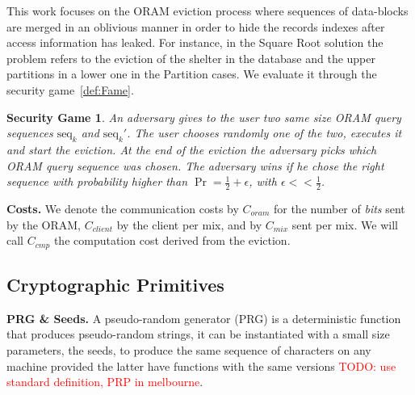 \documentclass{llncs}
\newtheorem{privdef}{Privacy Definition}
\newtheorem*{secgme}{Security Game}
\newcommand{\todo}[1]{\textcolor{red}{TODO: #1}}
\begin{document}
This work focuses on the ORAM eviction process where sequences of data-blocks are merged in an oblivious manner in order to hide the records indexes after access information has leaked. For instance, in the Square Root solution the problem refers to the eviction of the shelter in the database and the upper partitions in a lower one in the Partition cases. We  evaluate it through the security game~\ref{def:Fame}.
%
\iffalse
\begin{privdef}
An ORAM eviction process is considered oblivious if an adversary cannot distinguish after eviction whether a specific record has been accessed.\\
That is to say, for the eviction of $s$ elements in an array of $n$ elements, and with $\epsilon =\mathcal{O}\left ( \frac{1}{n} \right )$, we have, $$ \forall i \in \llbracket 1, n \rrbracket,\ |\Pr(index_i \text{ was not retrieved} ) - \Pr(index_i \text{ was retrieved} )| \leq \epsilon$$
\label{def:Oblivious}
\end{privdef}
\fi
%
\begin{secgme}
An adversary gives to the user two same size ORAM query sequences $\text{seq}_k$ and $\text{seq}_k'$. The user chooses randomly one of the two, executes it and start the eviction. At the end of the eviction the adversary picks which ORAM query sequence was chosen. The adversary wins if he chose the right sequence with probability higher than $\Pr = \frac{1}{2}+\epsilon$, with $\epsilon<<\frac{1}{2}$.
\label{def:Game}
\end{secgme} 
%
\iffalse
\begin{privdef}{Eviction Old Security.}
An ORAM eviction process is considered secure if an adversary cannot distinguish after eviction the location of any specific record. 
\end{privdef}
\fi
%
\noindent\textbf{Costs.} We denote the communication costs by $C_{oram}$ for the number of \emph{bits} sent by the ORAM, $C_{client}$ by the client per mix, and by $C_{mix}$ sent per mix. 
We will call $C_{cmp}$ the computation cost derived from the eviction.
%
\subsection{Cryptographic Primitives}
\noindent\textbf{PRG \& Seeds.}
A pseudo-random generator (PRG) is a deterministic function that produces pseudo-random strings, it can be instantiated with a small size parameters, the seeds, to produce the same sequence of characters on any machine provided the latter have functions with the same versions \todo{use standard definition, PRP in melbourne}.\\\
\end{document}
